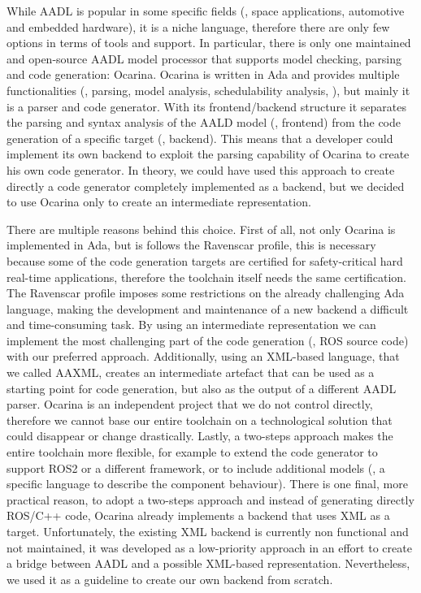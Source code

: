 While AADL is popular in some specific fields (\eg, space applications, automotive and embedded hardware), it is a niche language, therefore there are only few options in terms of tools and support. In particular, there is only one maintained and open-source AADL model processor that supports model checking, parsing and code generation: Ocarina. Ocarina is written in Ada and provides multiple functionalities (\eg, parsing, model analysis, schedulability analysis, \etc), but mainly it is a parser and code generator. With its frontend/backend structure it separates the parsing and syntax analysis of the AALD model (\ie, frontend) from the code generation of a specific target (\ie, backend). This means that a developer could implement its own backend to exploit the parsing capability of Ocarina to create his own code generator. In theory, we could have used this approach to create directly a code generator completely implemented as a backend, but we decided to use Ocarina only to create an intermediate representation.

There are multiple reasons behind this choice. First of all, not only Ocarina is implemented in Ada, but is follows the Ravenscar profile, this is necessary because some of the code generation targets are certified for safety-critical hard real-time applications, therefore the toolchain itself needs the same certification. The Ravenscar profile imposes some restrictions on the already challenging Ada language, making the development and maintenance of a new backend a difficult and time-consuming task. By using an intermediate representation we can implement the most challenging part of the code generation (\ie, ROS source code) with our preferred approach. Additionally, using an XML-based language, that we called AAXML, creates an intermediate artefact that can be used as a starting point for code generation, but also as the output of a different AADL parser. Ocarina is an independent project that we do not control directly, therefore we cannot base our entire toolchain on a technological solution that could disappear or change drastically. Lastly, a two-steps approach makes the entire toolchain more flexible, for example to extend the code generator to support ROS2 or a different framework, or to include additional models (\eg, a specific language to describe the component behaviour). There is one final, more practical reason, to adopt a two-steps approach and instead of generating directly ROS/C++ code, Ocarina already implements a backend that uses XML as a target. Unfortunately, the existing XML backend is currently non functional and not maintained, it was developed as a low-priority approach in an effort to create a bridge between AADL and a possible XML-based representation. Nevertheless, we used it as a guideline to create our own backend from scratch.

